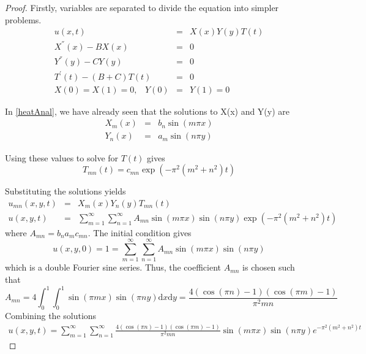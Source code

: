 \documentclass[12pt, oneside]{book}
\theoremstyle{plain}
\theoremstyle{definition}
\begin{document}
\begin{proof}
Firstly, variables are separated to divide the equation into simpler problems.
\begin{eqnarray*}
u(x,t) &=& X(x) Y(y) T(t) \\[10pt]
X^{''}(x) - B X(x) &=& 0 \\[10pt]
Y^{''}(y) - C Y(y) &=& 0 \\[10pt]
T^{'}(t) - (B + C) T(t) &=& 0 \\[10pt]
X(0) = X(1) = 0, \hspace{10pt} Y(0) &=& Y(1) = 0
\end{eqnarray*}

In \ref{heatAnal}, we have already seen that the solutions to X(x) and Y(y) are
\begin{eqnarray} 
X_m (x) &=& b_n \sin(m \pi x) \\
Y_n (x) &=& a_m \sin(n \pi y)
\end{eqnarray}

Using these values to solve for $T(t)$ gives
\begin{equation}
T_{mn}(t) = c_{mn} \exp(- \pi^2 (m^2 + n^2)t)
\end{equation}

Substituting the solutions yields
\begin{eqnarray}
u_{mn}(x, y, t) &=& X_m(x) Y_n(y) T_{mn}(t)\\
u(x, y, t) &=& \sum_{m=1}^{\infty} \sum_{n=1}^{\infty} A_{mn} \sin(m \pi x) \sin(n \pi y) \exp(- \pi^2 (m^2 + n^2)t)
\end{eqnarray}
where $A_{mn} = b_n a_m c_{mn}$.
The initial condition gives
\begin{equation}
u(x, y, 0) = 1 = \sum_{m=1}^{\infty} \sum_{n=1}^{\infty}  A_{mn} \sin(m \pi x) \sin(n \pi y)
\end{equation}
which is a double Fourier sine series. Thus, the coefficient $A_{mn}$ is chosen such that
\begin{equation}
 A_{mn} = 4 \int_{0}^{1}  \int_{0}^{1} \sin(\pi m x) \sin(\pi n y) \mathrm{d}x \mathrm{d}y = \frac{4(\cos(\pi n) - 1)(\cos(\pi m) - 1)}{\pi^2 m n} 
\end{equation}
Combining the solutions
\begin{eqnarray}
u(x, y, t) = \sum_{m=1}^{\infty} \sum_{n=1}^{\infty} \frac{4(\cos(\pi n) - 1)(\cos(\pi m) - 1)}{\pi^2 m n}  \sin(m \pi x) \sin(n \pi y) e^{- \pi^2 (m^2 + n^2)t}\end{eqnarray}
\end{proof}
\end{document}
